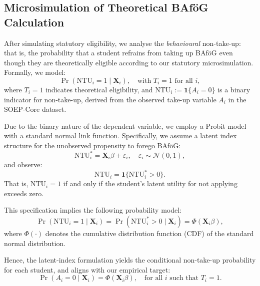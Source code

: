 \subsection{Microsimulation of Theoretical BAföG Calculation}

After simulating statutory eligibility, we analyse the \textit{behavioural} non-take-up: 
that is, the probability that a student refrains from taking up BAföG even though they are theoretically eligible according to our statutory microsimulation. 
Formally, we model:
\begin{equation}
  \Pr(\mathrm{NTU}_i = 1 \mid \mathbf{X}_i), \quad \text{with } T_i = 1 \text{ for all } i,
\end{equation}
where \( T_i = 1 \) indicates theoretical eligibility, and \( \mathrm{NTU}_i := \mathbf{1}\{A_i = 0\} \) is a binary indicator for non-take-up, derived from the observed take-up variable \( A_i \) in the SOEP-Core dataset.

Due to the binary nature of the dependent variable, we employ a Probit model with a standard normal link function. Specifically, we assume a latent index structure for the unobserved propensity to forego BAföG:
\begin{equation}
  \mathrm{NTU}_i^* = \mathbf{X}_i \beta + \varepsilon_i, 
  \quad 
  \varepsilon_i \sim \mathcal{N}(0,1),
\end{equation}
and observe:
\begin{equation}
  \mathrm{NTU}_i = \mathbf{1} \{ \mathrm{NTU}_i^* > 0 \}.
\end{equation}
That is, \( \mathrm{NTU}_i = 1 \) if and only if the student's latent utility for not applying exceeds zero.

This specification implies the following probability model:
\begin{equation}
  \Pr(\mathrm{NTU}_i = 1 \mid \mathbf{X}_i) = \Pr(\mathrm{NTU}_i^* > 0 \mid \mathbf{X}_i) = \Phi(\mathbf{X}_i \beta),
\end{equation}
where \( \Phi(\cdot) \) denotes the cumulative distribution function (CDF) of the standard normal distribution.

Hence, the latent-index formulation yields the conditional non-take-up probability for each student, and aligns with our empirical target:
\[
\Pr(A_i = 0 \mid \mathbf{X}_i) = \Phi(\mathbf{X}_i \beta), \quad \text{for all } i \text{ such that } T_i = 1.
\]


